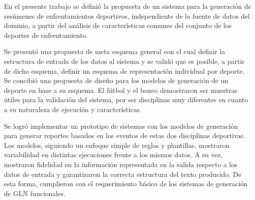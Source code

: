 \begin{conclusions}
    En el presente trabajo se definió la propuesta de un sistema para la 
generación de resúmenes de enfrentamientos deportivos, independiente de la fuente de datos del dominio, a
partir del análisis de características comunes del conjunto de los deportes de enfrentamiento.

Se presentó una propuesta de meta esquema general con el cual definir la estructura de entrada de
los datos al sistema y se validó que es posible, a partir de dicho esquema,  definir un esquema de representación individual por deporte. 
Se concibió una propuesta de diseño para los modelos de generación de un deporte en base a su esquema.
El fútbol y el boxeo demostraron ser muestras útiles para la validación del sistema, por ser disciplinas muy diferentes en cuanto a su naturaleza de 
ejecución y características.

    Se logró implementar un prototipo de sistemas con los modelos de generación para generar reportes basados en los eventos de estas dos
disciplinas deportivas. Los modelos, siguiendo un enfoque simple de reglas y plantillas, mostraron variabilidad en distintas ejecuciones frente a los 
mismos datos. A su vez, mostraron fidelidad en la información representada en la salida respecto a los datos de entrada y garantizaron la correcta estructura 
del texto producido. De esta forma, cumplieron con el requerimiento básico de los sistemas de generación de GLN funcionales.

    

\end{conclusions}


